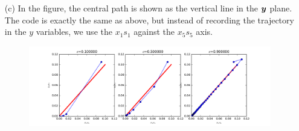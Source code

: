 \documentclass{article}
\begin{document}
\begin{itemize}
 \item[(c)] In the figure, the central path is shown as the vertical line in the $\bm{y}$ plane.
 The code is exactly the same as above, but instead of recording the trajectory in the $y$ variables, we use the $x_1s_1$ against the $x_5s_5$ axis. 

\begin{figure}[h!]
  \centering
  \includegraphics[width=1\textwidth]{images/central_xs.png}
 \end{figure}
 
\end{itemize}
\end{document}
